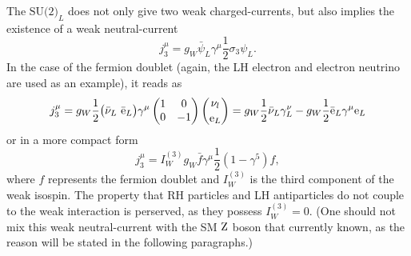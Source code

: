 The $\text{SU(2)}_{L}$ does not only give two weak charged-currents, but also implies the existence of a weak neutral-current
\begin{equation}
\label{eqn:WeakNeuCur}
j_{3}^{\mu}=g_{W}\bar{\psi}_{L}\gamma^{\mu}\frac{1}{2}\sigma_{3}\psi_{L}.
\end{equation}
In the case of the fermion doublet (again, the LH electron and electron neutrino are used as an example), it reads as
\begin{equation}
\label{eqn:WeakCur5}
j_{3}^{\mu}=g_{W}\frac{1}{2} \big(\bar{\nu}_{L}\ \bar{\mathrm{e}}_{L}\big) \gamma^{\mu} \begin{pmatrix}
  1 & 0 \\
  0 & -1 
 \end{pmatrix}
 \binom{\nu_{l}}{\mathrm{e}_{L}} = g_{W}\frac{1}{2} \bar{\nu}_{L}\gamma^{\nu}_{L} - g_{W}\frac{1}{2} \bar{\mathrm{e}}_{L}\gamma^{\mu}\mathrm{e}_{L}
\end{equation}
or in a more compact form
\begin{equation}
\label{eqn:WeakCur6}
j_{3}^{\mu}=I_{W}^{(3)}g_{W}\bar{f}\gamma^{\mu} \frac{1}{2} (1-\gamma^{5}) f,
\end{equation}
where $f$ represents the fermion doublet and $I_{W}^{(3)}$ is the third component of the weak isospin. 
The property that RH particles and LH antiparticles do not couple to the weak interaction is perserved, as they possess $I_{W}^{(3)}=0$.
(One should not mix this weak neutral-current with the SM $\mathrm{Z}$ boson that currently known, as the reason will be stated in the following paragraphs.)

